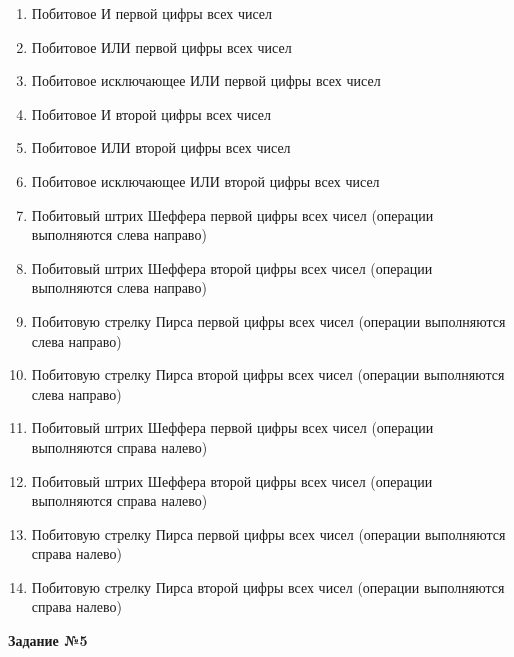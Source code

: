 \begin{enumerate}
	\item Побитовое И первой цифры всех чисел
	\item Побитовое ИЛИ первой цифры  всех чисел
	\item Побитовое исключающее ИЛИ первой цифры всех чисел
	\item Побитовое И второй цифры всех чисел
	\item Побитовое ИЛИ второй цифры  всех чисел
	\item Побитовое исключающее ИЛИ второй цифры всех чисел
	\item Побитовый штрих Шеффера первой цифры всех чисел (операции выполняются слева направо)
	\item Побитовый штрих Шеффера второй цифры всех чисел (операции выполняются слева направо)
	\item Побитовую стрелку Пирса первой цифры всех чисел (операции выполняются слева направо)
	\item Побитовую стрелку Пирса второй цифры всех чисел (операции выполняются слева направо)
	\item Побитовый штрих Шеффера первой цифры всех чисел (операции выполняются справа налево)
	\item Побитовый штрих Шеффера второй цифры всех чисел (операции выполняются справа налево)
	\item Побитовую стрелку Пирса первой цифры всех чисел (операции выполняются справа налево)
	\item Побитовую стрелку Пирса второй цифры всех чисел (операции выполняются справа налево)


\end{enumerate}

\textbf{Задание №5}

